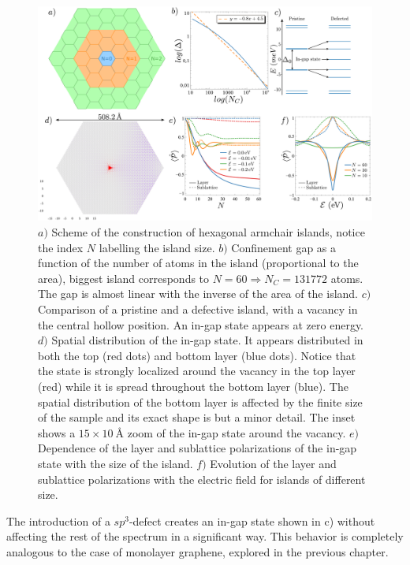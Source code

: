 \begin{figure}[!ht!]
\centering
\includegraphics[width=\textwidth]{artlat/fig/confinement.pdf}
\vspace{-20pt}
\caption{$a)$ Scheme of the construction of hexagonal armchair islands, notice the index $N$ labelling the island size. $b)$ Confinement gap as a function of the number of atoms in the island (proportional to the area), biggest island corresponds to $N=60\Rightarrow N_C=131772$ atoms. The gap is almost linear with the inverse of the area of the island. $c)$ Comparison of a pristine and a defective island, with a vacancy in the central hollow position. An in-gap state appears at zero energy. $d)$ Spatial distribution of the in-gap state. It appears distributed in both the top (red dots) and bottom layer (blue dots). Notice that the state is strongly localized around the vacancy in the top layer (red) while it is spread throughout the bottom layer (blue). The spatial distribution of the bottom layer is affected by the finite size of the sample and its exact shape is but a minor detail. The inset shows a $15\times\SI{10}{\angstrom}$ zoom of the in-gap state around the vacancy. $e)$ Dependence of the layer and sublattice polarizations of the in-gap state with the size of the island. $f)$ Evolution of the layer and sublattice polarizations with the electric field for islands of different size.}
\label{confinement}
\end{figure}
\smallskip


The introduction of a $sp^3$-defect creates an in-gap state shown in c) without affecting the rest of the spectrum in a significant way. This behavior is completely analogous to the case of monolayer graphene, explored in the previous chapter.

